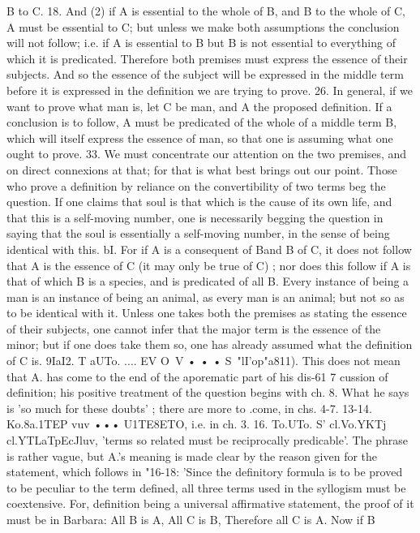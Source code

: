 {{{{{{{{{{{{{{{{{{{{{{{{B to C.
18. And (2) if A is essential to the whole of B, and B to the
whole of C, A must be essential to C; but unless we make both
assumptions the conclusion will not follow; i.e. if A is essential
to B but B is not essential to everything of which it is predicated.
Therefore both premises must express the essence of their subjects.
And so the essence of the subject will be expressed in the middle
term before it is expressed in the definition we are trying to prove.
26. In general, if we want to prove what man is, let C be man,
and A the proposed definition. If a conclusion is to follow, A
must be predicated of the whole of a middle term B, which will
itself express the essence of man, so that one is assuming what
one ought to prove.
33. We must concentrate our attention on the two premises,
and on direct connexions at that; for that is what best brings out
our point. Those who prove a definition by reliance on the
convertibility of two terms beg the question. If one claims that
soul is that which is the cause of its own life, and that this is a
self-moving number, one is necessarily begging the question in
saying that the soul is essentially a self-moving number, in the
sense of being identical with this.
bI. For if A is a consequent of Band B of C, it does not follow
that A is the essence of C (it may only be true of C) ; nor does this
follow if A is that of which B is a species, and is predicated of
all B. Every instance of being a man is an instance of being an
animal, as every man is an animal; but not so as to be identical
with it. Unless one takes both the premises as stating the
essence of their subjects, one cannot infer that the major term is
the essence of the minor; but if one does take them so, one has
already assumed what the definition of C is.
9IaI2. T aUTo. .... EV O~V • • • S~"lI'op"a811). This does not mean
that A. has come to the end of the aporematic part of his dis-61 7
cussion of definition; his positive treatment of the question begins
with ch. 8. What he says is 'so much for these doubts' ; there are
more to .come, in chs. 4-7.
13-14. Ko.8a.1TEP vuv ••• U1TE8ETO, i.e. in ch. 3.
16. To.UTo. S' cl.Vo.YKTj cl.YTLaTpEcJluv, 'terms so related must be
reciprocally predicable'. The phrase is rather vague, but A.'s
meaning is made clear by the reason given for the statement,
which follows in "16-18: 'Since the definitory formula is to be
proved to be peculiar to the term defined, all three terms used
in the syllogism must be coextensive. For, definition being a
universal affirmative statement, the proof of it must be in
Barbara: All B is A, All C is B, Therefore all C is A. Now if B
}}}}}}}}}}}}}}}}}}}}}}}}
